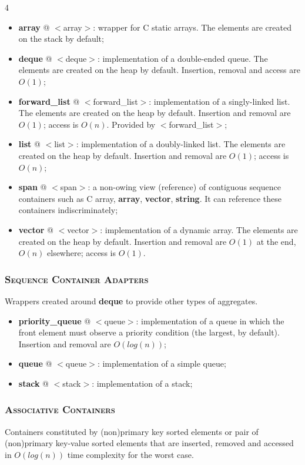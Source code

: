 \documentclass[10pt]{article}
\begin{document}
\begin{multicols*}{4}
{\begin{itemize}[leftmargin=*,topsep=0.25pt]
  \setlength\itemsep{-1.8pt}
	\item \textbf{array} @ $<$array$>$: wrapper for C static arrays. The elements are created on the stack by default;
	\item \textbf{deque} @ $<$deque$>$: implementation of a double-ended queue. The elements are created on the heap by default. Insertion, removal and access are $O(1)$;
	\item \textbf{forward\_list} @ $<$forward\_list$>$: implementation of a singly-linked list. The elements are created on the heap by default. Insertion and removal are $O(1)$; access is $O(n)$. Provided by $<$forward\_list$>$;  
	\item \textbf{list} @ $<$list$>$: implementation of a doubly-linked list. The elements are created on the heap by default. Insertion and removal are $O(1)$; access is $O(n)$;
  \item \textbf{span} @ $<$span$>$: a non-owing view (reference) of contiguous sequence containers such as C array, \textbf{array}, \textbf{vector}, \textbf{string}. It can  reference these containers indiscriminately;
	\item \textbf{vector} @ $<$vector$>$: implementation of a dynamic array. The elements are created on the heap by default. Insertion and removal are $O(1)$ at the end, $O(n)$ elsewhere; access is $O(1)$.
\end{itemize}

\subsubsection*{\textsc{Sequence Container Adapters}} 
\noindent
Wrappers created around \textbf{deque} to provide other types of aggregates.

\begin{itemize}[leftmargin=*,topsep=0.25pt]
  \setlength\itemsep{-1.8pt}
	\item \textbf{priority\_queue} @ $<$queue$>$: implementation of a queue in which the front element must observe a priority condition (the largest, by default). Insertion and removal are $O(log(n))$;
	\item \textbf{queue} @ $<$queue$>$: implementation of a simple queue;
	\item \textbf{stack} @ $<$stack$>$: implementation of a stack;
\end{itemize}
\noindent

\subsubsection*{\textsc{Associative Containers}} 
\noindent
Containers constituted by (non)primary key sorted elements or pair of (non)primary key-value sorted elements that are  inserted, removed and accessed in $O(log(n))$ time complexity for the worst case.

}
\end{multicols*}
\end{document}
